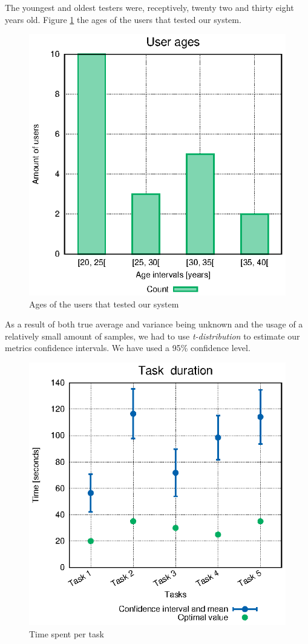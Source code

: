 \documentclass[conference,compsoc,a4paper]{IEEEtran}
\begin{document}
The youngest and oldest testers were, receptively, twenty two and thirty eight years old. Figure \ref{fig:user_ages} the ages of the users that tested our system.

\begin{figure}
  \centering
  \includegraphics[width=0.8\linewidth]{stats/user_ages.eps}
  \caption{Ages of the users that tested our system}
  \label{fig:user_ages}
\end{figure}

As a result of both true average and variance being unknown and the usage of a relatively small amount of samples, we had to use \emph{t-distribution} to estimate our metrics confidence intervals. We have used a 95\% confidence level.

\begin{figure}
  \centering
    \includegraphics[width=0.8\linewidth]{stats/user_times.eps}
    \caption{Time spent per task}
    \label{fig:user_times}
\end{figure}
\end{document}
